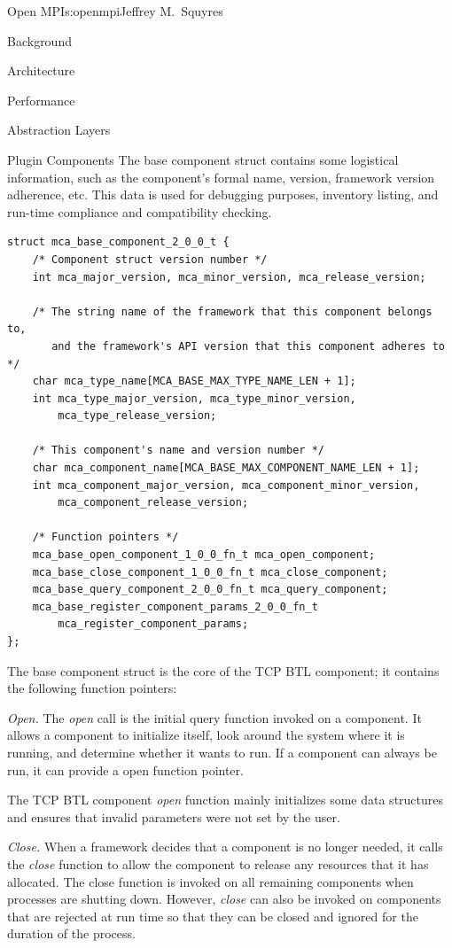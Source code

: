 \begin{aosachapter}{Open MPI}{s:openmpi}{Jeffrey M.\ Squyres}
\begin{aosasect1}{Background}
\begin{aosasect1}{Architecture}
\begin{aosasect2}{Performance}
\begin{aosasect2}{Abstraction Layers}
\begin{aosasect2}{Plugin Components}
The base component struct contains some logistical information, such
as the component's formal name, version, framework version adherence,
etc.
%
This data is used for debugging purposes, inventory listing, and
run-time compliance and compatibility checking.

\begin{verbatim}
struct mca_base_component_2_0_0_t {
    /* Component struct version number */
    int mca_major_version, mca_minor_version, mca_release_version;

    /* The string name of the framework that this component belongs to,
       and the framework's API version that this component adheres to */
    char mca_type_name[MCA_BASE_MAX_TYPE_NAME_LEN + 1];
    int mca_type_major_version, mca_type_minor_version,  
        mca_type_release_version;

    /* This component's name and version number */
    char mca_component_name[MCA_BASE_MAX_COMPONENT_NAME_LEN + 1];
    int mca_component_major_version, mca_component_minor_version,
        mca_component_release_version;

    /* Function pointers */  
    mca_base_open_component_1_0_0_fn_t mca_open_component;
    mca_base_close_component_1_0_0_fn_t mca_close_component;
    mca_base_query_component_2_0_0_fn_t mca_query_component;
    mca_base_register_component_params_2_0_0_fn_t 
        mca_register_component_params;
};
\end{verbatim}

The base component struct is the core of the TCP BTL component; it
contains the following function pointers:

\begin{aosaitemize}
\item \emph{Open.} The \emph{open} call is the initial query function
  invoked on a component.  It allows a component to initialize itself,
  look around the system where it is running, and determine whether it
  wants to run.  If a component can always be run, it can provide a
   open function pointer.

  The TCP BTL component \emph{open} function mainly initializes some
  data structures and ensures that invalid parameters were not set by
  the user.

\item \emph{Close.} When a framework decides that a component is no
  longer needed, it calls the \emph{close} function to allow the
  component to release any resources that it has allocated.  The close
  function is invoked on all remaining components when processes are
  shutting down.  However, \emph{close} can also be invoked on
  components that are rejected at run time so that they can be closed
  and ignored for the duration of the process.


\end{aosaitemize}
\end{aosasect2}
\end{aosasect2}
\end{aosasect2}
\end{aosasect1}
\end{aosasect1}
\end{aosachapter}
